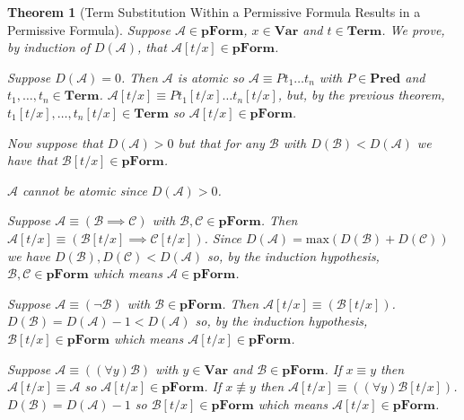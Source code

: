 \documentclass[12pt]{article}
\theoremstyle{break}
\theoremstyle{break}
\newtheorem{theorem}{Theorem}[section]
\theoremstyle{break}
\theoremstyle{break}
\newcommand{\mc}[1]{\mathcal{#1}}
\begin{document}
\begin{theorem}[Term Substitution Within a Permissive Formula Results in a Permissive Formula]
Suppose $\mc{A}\in\textbf{pForm}$, $x\in\textbf{Var}$ and $t \in \textbf{Term}$.
We prove, by induction of $D(\mc{A})$, that $\mc{A}[t/x] \in \textbf{pForm}$.

Suppose $D(\mc{A}) = 0$.
Then $\mc{A}$ is atomic so $\mc{A}\equiv Pt_1\ldots t_n$ with $P\in\textbf{Pred}$ and $t_1,\ldots, t_n\in\textbf{Term}$. $\mc{A}[t/x] \equiv Pt_1[t/x]\ldots t_n[t/x]$, but, by the previous theorem, $t_1[t/x],\ldots,t_n[t/x]\in\textbf{Term}$ so $\mc{A}[t/x]\in\textbf{pForm}$.

Now suppose that $D(\mc{A}) > 0$ but that for any $\mc{B}$ with $D(\mc{B}) < D(\mc{A})$ we have that $\mc{B}[t/x] \in \textbf{pForm}$.

$\mc{A}$ cannot be atomic since $D(\mc{A})>0$.

Suppose $\mc{A} \equiv (\mc{B}\implies \mc{C})$ with $\mc{B}, \mc{C}\in\textbf{pForm}$.
Then $\mc{A}[t/x] \equiv (\mc{B}[t/x] \implies \mc{C}[t/x])$.
Since $D(\mc{A}) = \text{max}(D(\mc{B}) + D(\mc{C}))$ we have $D(\mc{B}), D(\mc{C}) < D(\mc{A})$ so, by the induction hypothesis, $\mc{B}, \mc{C}\in\textbf{pForm}$ which means $\mc{A}\in\textbf{pForm}$.

Suppose $\mc{A} \equiv (\lnot \mc{B})$ with $\mc{B}\in\textbf{pForm}$.
Then $\mc{A}[t/x] \equiv (\mc{B}[t/x])$.
$D(\mc{B}) = D(\mc{A}) -1 < D(\mc{A})$ so, by the induction hypothesis, $\mc{B}[t/x]\in\textbf{pForm}$ which means $\mc{A}[t/x]\in\textbf{pForm}$.

Suppose $\mc{A} \equiv ((\forall y) \mc{B})$ with $y\in\textbf{Var}$ and $\mc{B}\in\textbf{pForm}$.
If $x\equiv y$ then $\mc{A}[t/x] \equiv \mc{A}$ so $\mc{A}[t/x]\in\textbf{pForm}$.
If $x\not\equiv y$ then $\mc{A}[t/x] \equiv ((\forall y) \mc{B}[t/x])$.
$D(\mc{B}) = D(\mc{A})-1$ so $\mc{B}[t/x]\in\textbf{pForm}$ which means $\mc{A}[t/x]\in\textbf{pForm}$.

\end{theorem}
\end{document}
